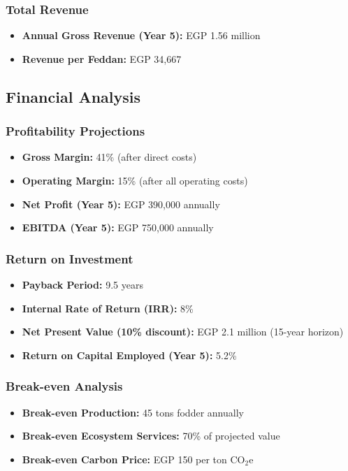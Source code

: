 \subsubsection{Total Revenue}
\begin{itemize}
    \item \textbf{Annual Gross Revenue (Year 5):} EGP 1.56 million
    \item \textbf{Revenue per Feddan:} EGP 34,667
\end{itemize}

\subsection{Financial Analysis}

\subsubsection{Profitability Projections}
\begin{itemize}
    \item \textbf{Gross Margin:} 41\% (after direct costs)
    \item \textbf{Operating Margin:} 15\% (after all operating costs)
    \item \textbf{Net Profit (Year 5):} EGP 390,000 annually
    \item \textbf{EBITDA (Year 5):} EGP 750,000 annually
\end{itemize}

\subsubsection{Return on Investment}
\begin{itemize}
    \item \textbf{Payback Period:} 9.5 years
    \item \textbf{Internal Rate of Return (IRR):} 8\%
    \item \textbf{Net Present Value (10\% discount):} EGP 2.1 million (15-year horizon)
    \item \textbf{Return on Capital Employed (Year 5):} 5.2\%
\end{itemize}

\subsubsection{Break-even Analysis}
\begin{itemize}
    \item \textbf{Break-even Production:} 45 tons fodder annually
    \item \textbf{Break-even Ecosystem Services:} 70\% of projected value
    \item \textbf{Break-even Carbon Price:} EGP 150 per ton CO$_2$e
\end{itemize}

